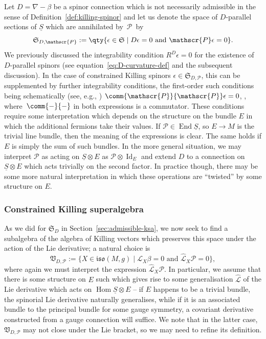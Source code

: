 \documentclass[10pt,a4paper]{amsart}
\numberwithin{equation}{section}
\newcommand{\fiso}{\mathfrak{iso}}
\newcommand{\fS}{\mathfrak{S}}
\newcommand{\fV}{\mathfrak{V}}
\newcommand{\eL}{\mathscr{L}}
\newcommand{\eP}{\mathscr{P}}
\newcommand{\Sbundle}{\underline{S}}
\newcommand{\eLhat}{\widehat{\eL}}
\newcommand{\1}{\mathbbm{1}}
\DeclareMathOperator{\Id}{Id}
\DeclareMathOperator{\End}{End}
\DeclareMathOperator{\Hom}{Hom}
\begin{document}
Let $D=\nabla-\beta$ be a spinor connection which is not necessarily admissible in the sense of Definition~\ref{def:killing-spinor} and let us denote the space of $D$-parallel sections of $\Sbundle$ which are annihilated by~$\eP$~by
\[
	\fS_{D,\eP} := \qty{\epsilon\in\fS\mid D\epsilon = 0 \text{ and } \eP\epsilon = 0}.
\]
We previously discussed the integrability condition $R^D\epsilon=0$ for the existence of $D$-parallel spinors (see equation~\eqref{eq:D-curvature-def} and the subsequent discussion). In the case of constrained Killing spinors $\epsilon\in\fS_{D,\eP}$, this can be supplemented by further integrability conditions, the first-order such conditions being schematically (see, e.g., \cite{Gran2019})
$\comm{\eP}{\eP}\epsilon = 0$, \smash{$\widehat{D}\eP \epsilon := \comm{D}{\eP}\epsilon = 0$},
where~${\comm{-}{-}}$ in both expressions is a commutator. These conditions require some interpretation which depends on the structure on the bundle $E$ in which the additional fermions take their values. If $\eP\in\End\Sbundle$, so $E\to M$ is the trivial line bundle, then the meaning of the expressions is clear. The same holds if $E$ is simply the sum of such bundles. In the more general situation, we may interpret $\eP$ as acting on $\Sbundle\otimes E$ as $\eP\otimes\Id_E$ and extend $D$ to a connection on $\Sbundle\otimes E$ which acts trivially on the second factor. In practice though, there may be some more natural interpretation in which these operations are ``twisted'' by some structure on $E$.

\subsubsection{Constrained Killing superalgebra}

As we did for $\fS_D$ in Section~\ref{sec:admissible-ksa}, we now seek to find a subalgebra of the algebra of Killing vectors which preserves this space under the action of the Lie derivative; a natural choice is
\[
	\fV_{D,\eP} := \big\{X\in\fiso(M,g) \mid \eL_X \beta = 0 \text{ and } \eLhat_X \eP = 0\big\},
\]
where again we must interpret the expression $\eLhat_X \eP$. In particular, we assume that there is some structure on $E$ such which gives rise to some generalisation $\eLhat$ of the Lie derivative which acts on $\Hom\Sbundle\otimes E$ -- if $E$ happens to be a trivial bundle, the spinorial Lie derivative naturally generalises, while if it is an associated bundle to the principal bundle for some gauge symmetry, a covariant derivative constructed from a gauge connection will suffice. We note that in the latter case, $\fV_{D,\eP}$ may not close under the Lie bracket, so we may need to refine its definition.
\end{document}
